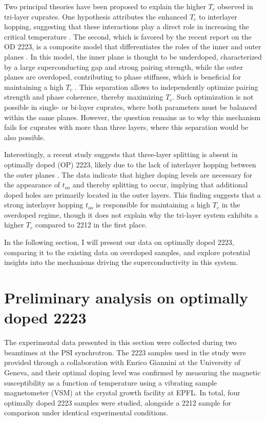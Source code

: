 Two principal theories have been proposed to explain the higher $T_c$ observed in tri-layer cuprates.
One hypothesis attributes the enhanced $T_c$ to interlayer hopping, suggesting that these interactions play a direct role in increasing the critical temperature \cite{chakravarty_explanation_2004,nishiguchi_superconductivity_2013}.
The second, which is favored by the recent report on the OD 2223, is a composite model that differentiates the roles of the inner and outer planes \cite{kivelson_making_2002,berg_route_2008,okamoto_enhanced_2008}.
In this model, the inner plane is thought to be underdoped, characterized by a large superconducting gap and strong pairing strength, while the outer planes are overdoped, contributing to phase stiffness, which is beneficial for maintaining a high $T_c$ \cite{emery_importance_1995}.
This separation allows to independently optimize pairing strength and phase coherence, thereby maximizing $T_c$.
Such optimization is not possible in single- or bi-layer cuprates, where both parameters must be balanced within the same planes.
However, the question remains as to why this mechanism fails for cuprates with more than three  layers, where this separation would be also possible.

Interestingly, a recent study suggests that three-layer splitting is absent in optimally doped (OP) 2223, likely due to the lack of interlayer hopping between the outer planes \cite{luo_electronic_2023}.
The data indicate that higher doping levels are necessary for the appearance of $t_{oo}$ and thereby splitting to occur, implying that additional doped holes are primarily located in the outer layers.
This finding suggests that a strong interlayer hopping $t_{oo}$ is responsible for maintaining a high $T_c$ in the overdoped regime, though it does not explain why the tri-layer system exhibits a higher $T_c$ compared to 2212 in the first place.

In the following section, I will present our data on optimally doped 2223, comparing it to the existing data on overdoped samples, and explore potential insights into the mechanisms driving the superconductivity in this system.

\section{Preliminary analysis on optimally doped 2223}

The experimental data presented in this section were collected during two beamtimes at the PSI synchrotron.
The 2223 samples used in the study were provided through a collaboration with Enrico Giannini at the University of Geneva, and their optimal doping level was confirmed by measuring the magnetic susceptibility as a function of temperature using a vibrating sample magnetometer (VSM) at the crystal growth facility at EPFL.
In total, four optimally doped 2223 samples were studied, alongside a 2212 sample for comparison under identical experimental conditions.

